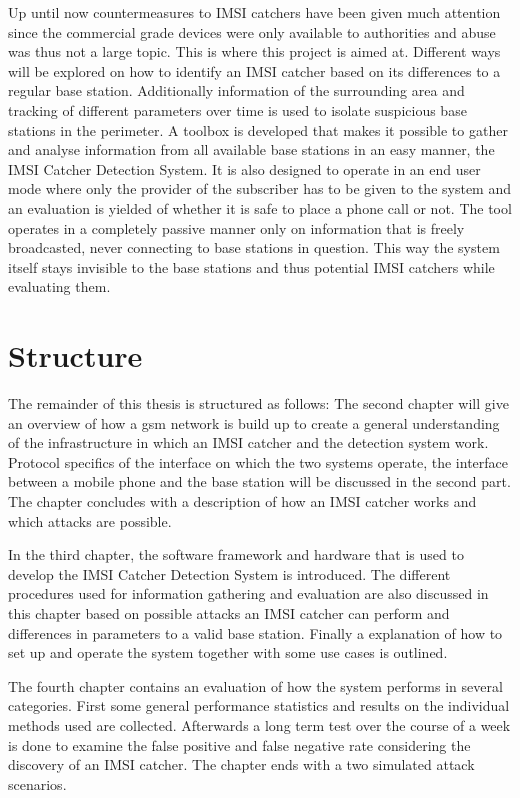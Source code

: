 Up until now countermeasures to IMSI catchers have been given much attention since the commercial grade devices were only available to authorities and abuse was thus not a large topic.
This is where this project is aimed at.
Different ways will be explored on how to identify an IMSI catcher based on its differences to a regular base station.
Additionally information of the surrounding area and tracking of different parameters over time is used to isolate suspicious base stations in the perimeter.
A toolbox is developed that makes it possible to gather and analyse information from all available base stations in an easy manner, the IMSI Catcher Detection System.
It is also designed to operate in an end user mode where only the provider of the subscriber has to be given to the system and an evaluation is yielded of whether it is safe to place a phone call or not.
The tool operates in a completely passive manner only on information that is freely broadcasted, never connecting to base stations in question.
This way the system itself stays invisible to the base stations and thus potential IMSI catchers while evaluating them.

\section{Structure}
The remainder of this thesis is structured as follows:
The second chapter will give an overview of how a \gls{gsm} network is build up to create a general understanding of the infrastructure in which an IMSI catcher and the detection system work.
Protocol specifics of the interface on which the two systems operate, the interface between a mobile phone and the base station will be discussed in the second part.
The chapter concludes with a description of how an IMSI catcher works and which attacks are possible.

In the third chapter, the software framework and hardware that is used to develop the IMSI Catcher Detection System is introduced.
The different procedures used for information gathering and evaluation are also discussed in this chapter based on possible attacks an IMSI catcher can perform and differences in parameters to a valid base station.
Finally a explanation of how to set up and operate the system together with some use cases is outlined.

The fourth chapter contains an evaluation of how the system performs in several categories.
First some general performance statistics and results on the individual methods used are collected.
Afterwards a long term test over the course of a week is done to examine the false positive and false negative rate considering the discovery of an IMSI catcher.
The chapter ends with a two simulated attack scenarios.


